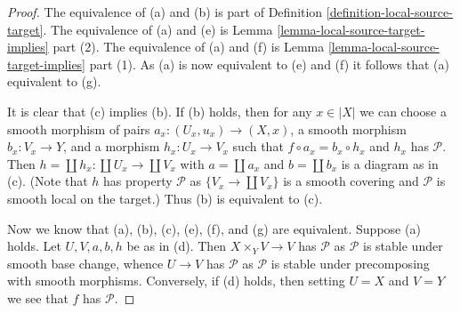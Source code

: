 \documentclass[10pt,a4paper]{amsart}
\theoremstyle{plain}
\theoremstyle{definition}
\theoremstyle{remark}
\numberwithin{equation}{subsection}
\begin{document}
\begin{proof}
The equivalence of (a) and (b) is part of
Definition \ref{definition-local-source-target}.
The equivalence of (a) and (e) is
Lemma \ref{lemma-local-source-target-implies} part (2).
The equivalence of (a) and (f) is
Lemma \ref{lemma-local-source-target-implies} part (1).
As (a) is now equivalent to (e) and (f) it follows that
(a) equivalent to (g).

\medskip\noindent
It is clear that (c) implies (b). If (b) holds, then for any
$x \in |X|$ we can choose a smooth morphism of pairs
$a_x : (U_x, u_x) \to (X, x)$, a smooth morphism $b_x : V_x \to Y$, and
a morphism $h_x : U_x \to V_x$ such that $f \circ a_x = b_x \circ h_x$ and
$h_x$ has $\mathcal{P}$. Then $h = \coprod h_x : \coprod U_x \to \coprod V_x$
with $a = \coprod a_x$ and $b = \coprod b_x$ is a diagram as in (c).
(Note that $h$ has property $\mathcal{P}$ as $\{V_x \to \coprod V_x\}$
is a smooth covering and $\mathcal{P}$ is smooth local on the target.)
Thus (b) is equivalent to (c).

\medskip\noindent
Now we know that (a), (b), (c), (e), (f), and (g) are equivalent.
Suppose (a) holds. Let $U, V, a, b, h$ be as in (d). Then
$X \times_Y V \to V$ has $\mathcal{P}$ as $\mathcal{P}$ is stable under
smooth base change, whence $U \to V$ has $\mathcal{P}$ as $\mathcal{P}$
is stable under precomposing with smooth morphisms. Conversely, if (d)
holds, then setting $U = X$ and $V = Y$ we see that $f$ has $\mathcal{P}$.
\end{proof}
\end{document}
